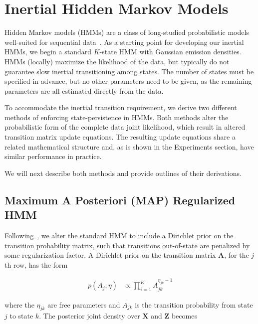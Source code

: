 \documentclass[letterpaper]{article}
\begin{document}
\section{Inertial Hidden Markov Models}
\vspace{-0.1cm}
Hidden Markov models (HMMs) are a class of long-studied probabilistic models
well-suited for sequential data~\cite{rabiner1989tutorial}. As a starting point
for developing our inertial HMMs, we begin a standard $K$-state HMM with
Gaussian emission densities. HMMs (locally) maximize the likelihood of the data,
but typically do not guarantee slow inertial transitioning among states. The
number of states must be specified in advance, but no other parameters need to
be given, as the remaining parameters are all estimated directly from the
data.

To accommodate the inertial transition requirement, we derive two different
methods of enforcing state-persistence in HMMs. Both methods alter the
probabilistic form of the complete data joint likelihood, which result
in altered transition matrix update equations. The resulting update equations
share a related mathematical structure and, as is shown in
the Experiments section, have similar performance in practice.

We will next describe both methods and provide outlines of their derivations. 
\vspace{-0.1cm}
\subsection{Maximum A Posteriori (MAP) Regularized HMM}
\vspace{-0.1cm}
Following~\cite{MAP1994}, we alter the standard HMM to include a Dirichlet prior on the transition probability matrix, such that transitions out-of-state are penalized by some regularization factor. A Dirichlet prior on the transition matrix $\mathbf{A}$, for the $j$th row, has the form

\vspace{-0.5cm}
\begin{align*}
    p(A_j; \eta) &\propto \prod_{i=1}^{K} A_{jk}^{\eta_{jk}-1}
\end{align*}
\vspace{-0.1cm}

where the $\eta_{jk}$ are free parameters and $A_{jk}$ is the transition probability from state $j$ to state $k$. The posterior joint density over $\mathbf{X}$ and $\mathbf{Z}$ becomes
\end{document}
